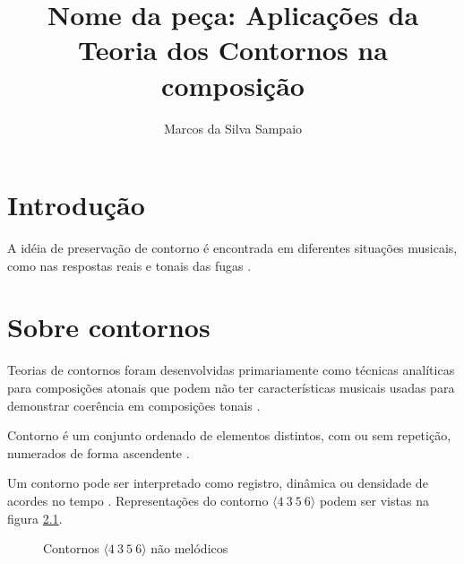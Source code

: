 \documentclass[12pt,brazil]{book}
\title{Nome da peça: Aplicações da Teoria dos Contornos na composição}
\author{Marcos da Silva Sampaio}
\newcommand{\contorno}[1]{$\langle #1 \rangle$}
\begin{document}
\maketitle
\tableofcontents
\listoftables
\listoffigures

\chapter{Introdução}
\label{cha:introducao}

A idéia de preservação de contorno é encontrada em diferentes
situações musicais, como nas respostas reais e tonais das fugas
\cite[p. 29]{morris87:composition}.

\chapter{Sobre contornos}
\label{cha:sobre-contornos}



Teorias de contornos foram desenvolvidas primariamente como técnicas
analíticas para composições atonais que podem não ter características
musicais usadas para demonstrar coerência em composições tonais
\cite[p. 1]{beard03:contour}.

Contorno é um conjunto ordenado de elementos distintos, com ou sem
repetição, numerados de forma ascendente
\cite[p. 206]{morris93:directions}.

Um contorno pode ser interpretado como registro, dinâmica ou densidade
de acordes no tempo \cite[p. 206]{morris93:directions}
\cite[p. 22]{clifford95:contour}. Representações do contorno
\contorno{4\:3\:5\:6} podem ser vistas na figura
\ref{fig:non-melodic-contours}.

\begin{figure}
  \centering
  \qquad
  \qquad

  \caption{Contornos \contorno{4\:3\:5\:6} não melódicos}
  \label{fig:non-melodic-contours}
\end{figure}
\end{document}
